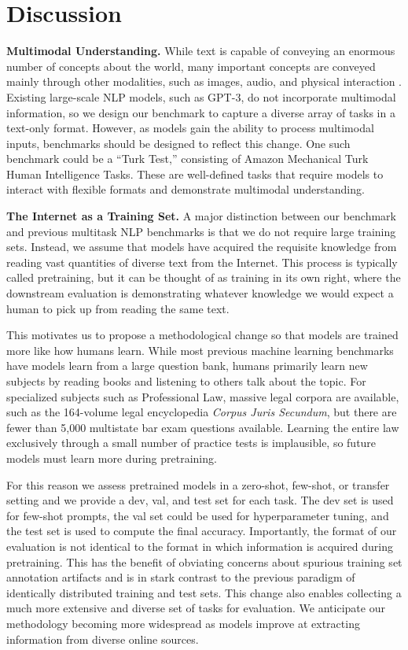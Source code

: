 \section{Discussion}
\noindent\textbf{Multimodal Understanding.}\quad
While text is capable of conveying an enormous number of concepts about the world, many important concepts are conveyed mainly through other modalities, such as images, audio, and physical interaction \citep{bisk2020experiencegroundslang}. Existing large-scale NLP models, such as GPT-3, do not incorporate multimodal information, so we design our benchmark to capture a diverse array of tasks in a text-only format. However, as models gain the ability to process multimodal inputs, benchmarks should be designed to reflect this change. One such benchmark could be a ``Turk Test,'' consisting of Amazon Mechanical Turk Human Intelligence Tasks. These are well-defined tasks that require models to interact with flexible formats and demonstrate multimodal understanding.

\noindent\textbf{The Internet as a Training Set.}\quad
A major distinction between our benchmark and previous multitask NLP benchmarks is that we do not require large training sets. Instead, we assume that models have acquired the requisite knowledge from reading vast quantities of diverse text from the Internet. This process is typically called pretraining, but it can be thought of as training in its own right, where the downstream evaluation is demonstrating whatever knowledge we would expect a human to pick up from reading the same text. 

This motivates us to propose a methodological change so that models are trained more like how humans learn.
While most previous machine learning benchmarks have models learn from a large question bank, humans primarily learn new subjects by reading books and listening to others talk about the topic. For specialized subjects such as Professional Law, massive legal corpora are available, such as the 164-volume legal encyclopedia \emph{Corpus Juris Secundum}, but there are fewer than 5,000 multistate bar exam questions available. Learning the entire law exclusively through a small number of practice tests is implausible, so future models must learn more during pretraining. 

For this reason we assess pretrained models in a zero-shot, few-shot, or transfer setting and we provide a dev, val, and test set for each task. The dev set is used for few-shot prompts, the val set could be used for hyperparameter tuning, and the test set is used to compute the final accuracy. Importantly, the format of our evaluation is not identical to the format in which information is acquired during pretraining. This has the benefit of obviating concerns about spurious training set annotation artifacts \citep{geirhos2020shortcut,Hendrycks2019NaturalAE} and is in stark contrast to the previous paradigm of identically distributed training and test sets. 
This change also enables collecting a much more extensive and diverse set of tasks for evaluation.
We anticipate our methodology becoming more widespread as models improve at extracting information from diverse online sources.


